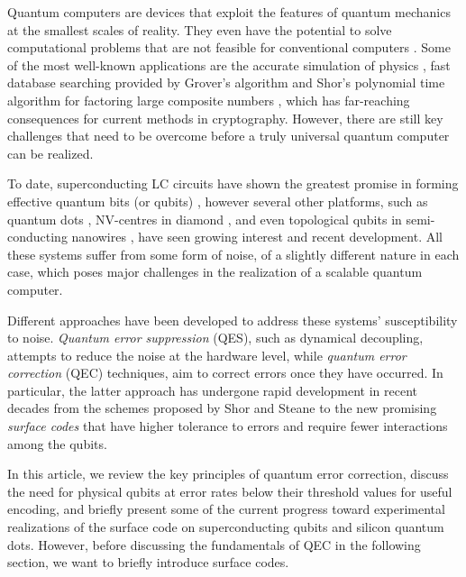 Quantum computers are devices that exploit the features of quantum mechanics at
the smallest scales of reality. They even have the potential to solve
computational problems that are not feasible for conventional computers
\cite{nielsen_chuang_2010}. Some of the most well-known applications are the
accurate simulation of physics \cite{feynman82_simul_physic_with_comput}, fast
database searching provided by Grover's algorithm \cite{Grover_1996} and Shor's
polynomial time algorithm for factoring large composite numbers
\cite{Shor_1997}, which has far-reaching consequences for current methods in
cryptography. However, there are still key challenges that need to
be overcome before a truly universal quantum computer can be realized.

To date, superconducting LC circuits have shown the greatest promise in forming
effective quantum bits (or qubits) \cite{Rol_2019}
\cite{barends14_super_quant_circuit_at_surfac}, however several other platforms,
such as quantum dots \cite{huang19_fidel_bench_two_qubit_gates_silic}
\cite{Lawrie_2020}, NV-centres in diamond \cite{Taminiau_2014}, and even
topological qubits in semi-conducting nanowires \cite{Mourik_2012}, have seen
growing interest and recent development. All these systems suffer from some
form of noise, of a slightly different nature in each case, which poses
major challenges in the realization of a scalable quantum computer.

Different approaches have been developed to address these systems'
susceptibility to noise. \textit{Quantum error suppression} (QES), such as
dynamical decoupling, attempts to reduce the noise at the hardware level, while
\textit{quantum error correction} (QEC) techniques, aim to correct errors
once they have occurred. In particular, the latter approach has undergone rapid
development in recent decades from the schemes proposed by Shor
\cite{Shor_1995_QEC} and Steane \cite{Steane_1996_QEC} to the new promising
\textit{surface codes} \cite{fowler12_surfac_codes} that have higher tolerance
to errors and require fewer interactions among the qubits.

In this article, we review the key principles of quantum error correction,
discuss the need for physical qubits at error rates below their threshold values
for useful encoding, and briefly present some of the current progress toward
experimental realizations of the surface code on superconducting qubits and
silicon quantum dots. However, before discussing the fundamentals of QEC in the
following section, we want to briefly introduce surface codes.

